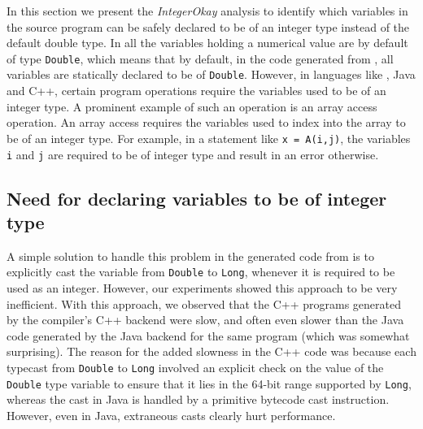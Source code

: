 \begin{comment}
What is integerokay analysis ?
why do we need it ?
How do we do it ?
\end{comment}

In this section we present the \emph{IntegerOkay} analysis to identify
which variables in the source \matlab program can be safely declared to
be of an integer type instead of the default double type. In \matlab all
the variables holding a numerical value are by default of type
\texttt{Double}, which means that by default, in the \xten code
generated from \matlab, all variables are statically declared to be of
\texttt{Double}. However, in languages like \xten, Java and C++, certain
program operations require the variables used to be of an integer type.
A prominent example of such an operation is an array access operation.
An array access requires the variables used to index into the array to
be of an integer type. For example, in a statement like \texttt{x =
A(i,j)}, the variables \texttt{i} and \texttt{j} are required to be of
integer type and result in an error otherwise.

\subsection{Need for declaring variables to be of integer type}

A simple solution to handle this problem in the generated code from
\matlab is to explicitly cast the variable from \texttt{Double} to
\texttt{Long}, whenever it is required to be used as an integer.
However, our experiments showed this approach to be very inefficient.
With this approach, we observed that the C++ programs generated by the
\xten compiler's C++ backend were slow, and often
even slower than the Java code generated by the \xten Java backend for
the same program (which was somewhat surprising). 
The reason for the added slowness in the C++ code was because each
typecast from \texttt{Double} to \texttt{Long} involved an explicit check on the
value of the \texttt{Double} type variable to ensure that it lies in the
64-bit range supported by \texttt{Long}, whereas the cast in Java is
handled by a primitive bytecode cast instruction.   However, even in
Java, extraneous casts clearly hurt performance.

